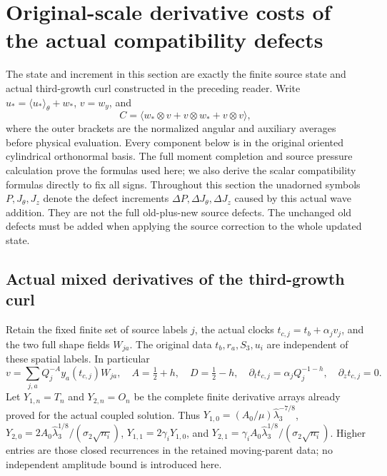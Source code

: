 \section{Original-scale derivative costs of the actual compatibility defects}
\label{mcq:section}

The state and increment in this section are exactly the finite source state
and actual third-growth curl constructed in the preceding reader.
Write \(u_*=\langle u_*\rangle_\theta+w_*\), \(v=w_y\), and
\[
 C=\langle w_*\otimes v+v\otimes w_*+v\otimes v\rangle,
\]
where the outer brackets are the normalized angular and auxiliary
averages before physical evaluation. Every component below is in the
original oriented cylindrical orthonormal basis. The full moment
completion and source pressure calculation prove the formulas used here;
we also derive the scalar compatibility formulas directly to fix all signs.
Throughout this section the unadorned symbols \(P,J_\theta,J_z\)
denote the defect increments \(\Delta P,\Delta J_\theta,\Delta J_z\)
caused by this actual wave addition. They are not the full old-plus-new
source defects. The unchanged old defects must be added when applying
the source correction to the whole updated state.

\subsection{Actual mixed derivatives of the third-growth curl}

Retain the fixed finite set of source labels \(j\), the actual clocks
\(t_{c,j}=t_b+\alpha_jv_j\), and the two full shape fields \(W_{ja}\).
The original data \(t_b,r_a,S_3,u_i\) are independent of these spatial
labels. In particular
\[
 v=\sum_{j,a}Q_j^{-A}y_a(t_{c,j})W_{ja},\quad
 A=\tfrac12+h,\quad D=\tfrac12-h,\quad
 \partial_t t_{c,j}=\alpha_jQ_j^{-1-h},\quad \partial_z t_{c,j}=0 .
\]
Let \(Y_{1,n}=T_n\) and \(Y_{2,n}=O_n\) be the complete finite
derivative arrays already proved for the actual coupled solution.
Thus \(Y_{1,0}=(A_0/\mu)\widehat\lambda_3^{-7/8}\),
\(Y_{2,0}=2A_0\widehat\lambda_3^{1/8}/(\sigma_2\sqrt{n_i})\),
\(Y_{1,1}=2\gamma_iY_{1,0}\), and
\(Y_{2,1}=\gamma_iA_0\widehat\lambda_3^{1/8}/(\sigma_2\sqrt{n_i})\).
Higher entries are those closed recurrences in the retained moving-parent
data; no independent amplitude bound is introduced here.

